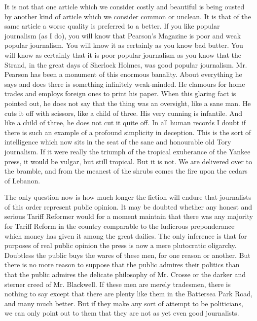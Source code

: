 It is not that one article which we consider costly and beautiful is being ousted by another kind of article which we consider common or unclean. It is that of the same article a worse quality is preferred to a better. If you like popular journalism (as I do), you will know that Pearson’s Magazine is poor and weak popular journalism. You will know it as certainly as you know bad butter. You will know as certainly that it is poor popular journalism as you know that the Strand, in the great days of Sherlock Holmes, was good popular journalism. Mr. Pearson has been a monument of this enormous banality. About everything he says and does there is something infinitely weak-minded. He clamours for home trades and employs foreign ones to print his paper. When this glaring fact is pointed out, he does not say that the thing was an oversight, like a sane man. He cuts it off with scissors, like a child of three. His very cunning is infantile. And like a child of three, he does not cut it quite off. In all human records I doubt if there is such an example of a profound simplicity in deception. This is the sort of intelligence which now sits in the seat of the sane and honourable old Tory journalism. If it were really the triumph of the tropical exuberance of the Yankee press, it would be vulgar, but still tropical. But it is not. We are delivered over to the bramble, and from the meanest of the shrubs comes the fire upon the cedars of Lebanon.

The only question now is how much longer the fiction will endure that journalists of this order represent public opinion. It may be doubted whether any honest and serious Tariff Reformer would for a moment maintain that there was any majority for Tariff Reform in the country comparable to the ludicrous preponderance which money has given it among the great dailies. The only inference is that for purposes of real public opinion the press is now a mere plutocratic oligarchy. Doubtless the public buys the wares of these men, for one reason or another. But there is no more reason to suppose that the public admires their politics than that the public admires the delicate philosophy of Mr. Crosse or the darker and sterner creed of Mr. Blackwell. If these men are merely tradesmen, there is nothing to say except that there are plenty like them in the Battersea Park Road, and many much better. But if they make any sort of attempt to be politicians, we can only point out to them that they are not as yet even good journalists.


